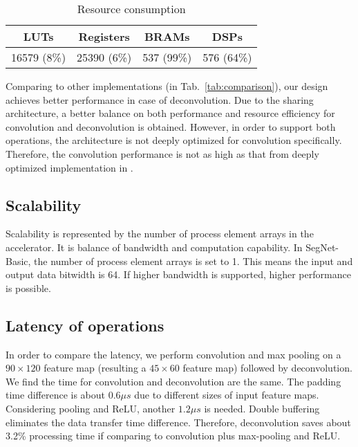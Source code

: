 \documentclass[conference]{IEEEtran}
\begin{document}
\begin{table}[htbp]
    \centering
    \caption{Resource consumption}
    \label{tab:resource}
    \begin{tabular}{|c|c|c|c|}
        \hline
        LUTs & Registers & BRAMs & DSPs \\
        \hline
        16579 (8\%) & 25390 (6\%) & 537 (99\%) & 576 (64\%) \\
        \hline
    \end{tabular}
\end{table}
Comparing to other implementations (in Tab.~\ref{tab:comparison}), our design achieves better performance in case of deconvolution. Due to the sharing architecture, a better balance on both performance and resource efficiency for convolution and deconvolution is obtained. However, in order to support both operations, the architecture is not deeply optimized for convolution specifically. Therefore, the convolution performance is not as high as that from deeply optimized implementation in \cite{ref:ref_18}.

\subsection{Scalability}
Scalability is represented by the number of process element arrays in the accelerator. It is balance of bandwidth and computation capability. In SegNet-Basic, the number of process element arrays is set to 1. This means the input and output data bitwidth is 64. If higher bandwidth is supported, higher performance is possible.

\subsection{Latency of operations}
In order to compare the latency, we perform convolution and max pooling on a $90\times 120$ feature map (resulting a $45\times 60$ feature map) followed by deconvolution. We find the time for convolution and deconvolution are the same. The padding time difference is about $0.6\mu s$ due to different sizes of input feature maps. Considering pooling and ReLU, another $1.2\mu s$ is needed. Double buffering eliminates the data transfer time difference. Therefore, deconvolution saves about 3.2\% processing time if comparing to convolution plus max-pooling and ReLU.


\begin{comment}
\begin{figure}[htbp]
	\centering
	\texttt{[image: fig/latency.png]}
	\caption{The latency comparison for convolution(top) and deconvolution(bottom)}
	\label{fig:latency}
\end{figure}
\end{comment}
\end{document}
